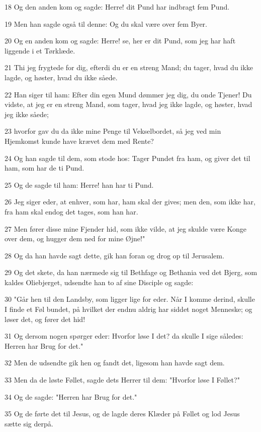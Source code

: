 \par 18 Og den anden kom og sagde: Herre! dit Pund har indbragt fem Pund.
\par 19 Men han sagde også til denne: Og du skal være over fem Byer.
\par 20 Og en anden kom og sagde: Herre! se, her er dit Pund, som jeg har haft liggende i et Tørklæde.
\par 21 Thi jeg frygtede for dig, efterdi du er en streng Mand; du tager, hvad du ikke lagde, og høster, hvad du ikke såede.
\par 22 Han siger til ham: Efter din egen Mund dømmer jeg dig, du onde Tjener! Du vidste, at jeg er en streng Mand, som tager, hvad jeg ikke lagde, og høster, hvad jeg ikke såede;
\par 23 hvorfor gav du da ikke mine Penge til Vekselbordet, så jeg ved min Hjemkomst kunde have krævet dem med Rente?
\par 24 Og han sagde til dem, som stode hos: Tager Pundet fra ham, og giver det til ham, som har de ti Pund.
\par 25 Og de sagde til ham: Herre! han har ti Pund.
\par 26 Jeg siger eder, at enhver, som har, ham skal der gives; men den, som ikke har, fra ham skal endog det tages, som han har.
\par 27 Men fører disse mine Fjender hid, som ikke vilde, at jeg skulde være Konge over dem, og hugger dem ned for mine Øjne!"
\par 28 Og da han havde sagt dette, gik han foran og drog op til Jerusalem.
\par 29 Og det skete, da han nærmede sig til Bethfage og Bethania ved det Bjerg, som kaldes Oliebjerget, udsendte han to af sine Disciple og sagde:
\par 30 "Går hen til den Landsby, som ligger lige for eder. Når I komme derind, skulle I finde et Føl bundet, på hvilket der endnu aldrig har siddet noget Menneske; og løser det, og fører det hid!
\par 31 Og dersom nogen spørger eder: Hvorfor løse I det? da skulle I sige således: Herren har Brug for det."
\par 32 Men de udsendte gik hen og fandt det, ligesom han havde sagt dem.
\par 33 Men da de løste Føllet, sagde dets Herrer til dem: "Hvorfor løse I Føllet?"
\par 34 Og de sagde: "Herren har Brug for det."
\par 35 Og de førte det til Jesus, og de lagde deres Klæder på Føllet og lod Jesus sætte sig derpå.
